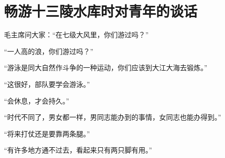 \section[畅游十三陵水库时对青年的谈话（一九六四年六月）]{畅游十三陵水库时对青年的谈话}


毛主席问大家：“在七级大风里，你们游过吗？”

“一人高的浪，你们游过吗？”

“游泳是同大自然作斗争的一种运动，你们应该到大江大海去锻炼。”

“这很好，部队要学会游泳。”

“会休息，才会持久。”

“时代不同了，男女都一样，男同志能办到的事情，女同志也能办得到。”

“将来打仗还是要靠两条腿。”

“有许多地方通不过去，看起来只有两只脚有用。”


